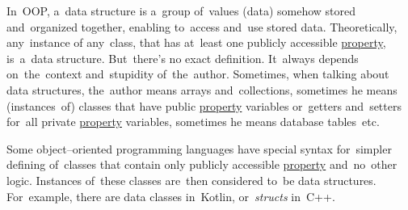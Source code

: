 \label{datastructure}
In~OOP, a~data structure is a~group of~values (data) somehow stored and~organized together, enabling to~access and~use stored data.
Theoretically, any~instance of any~class, that has at~least one publicly accessible \hyperref[variablefieldproperty]{property}, is~a~data structure.
But~there's no exact definition.
It~always depends on~the~context and~stupidity of~the~author.
Sometimes, when talking about data structures, the~author means arrays and~collections, sometimes he means (instances~of) classes that have public \hyperref[variablefieldproperty]{property} variables or~getters and~setters for~all private \hyperref[variablefieldproperty]{property} variables, sometimes he means database tables~etc.

Some object--oriented programming languages have special syntax for~simpler defining of~classes that contain only publicly accessible \hyperref[variablefieldproperty]{property} and~no~other logic.
Instances of~these classes are~then considered to~be data structures.
For~example, there are data classes in~Kotlin, \mbox{or \textit{structs}} in~C++.

